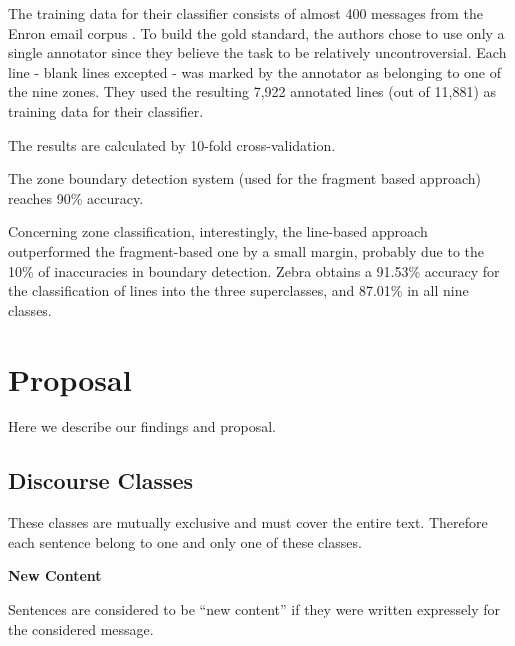 \documentclass[11pt]{article}
\begin{document}
The training data for their classifier consists of almost 400 messages from the Enron email corpus \cite{klimt2004enron}. To build the gold standard, the authors chose to use only a single annotator since they believe the task to be relatively uncontroversial. Each line - blank lines excepted - was marked by the annotator as belonging to one of the nine zones. They used the resulting 7,922 annotated lines (out of 11,881) as training data for their classifier.

The results are calculated by 10-fold cross-validation. 

The zone boundary detection system (used for the fragment based approach) reaches 90\% accuracy.

Concerning zone classification, interestingly, the line-based approach outperformed the fragment-based one by a small margin, probably due to the 10\% of inaccuracies in boundary detection. Zebra obtains a 91.53\% accuracy for the classification of lines into the three superclasses, and 87.01\% in all nine classes.

\section{Proposal}

Here we describe our findings and proposal.

\subsection{Discourse Classes}

These classes are mutually exclusive and must cover the entire text. Therefore each sentence belong to one and only one of these classes.

\vspace{0.5cm}
\textbf{New Content}
\vspace{0.1cm}

Sentences are considered to be ``new content'' if they were written expressely for the considered message.
\end{document}
